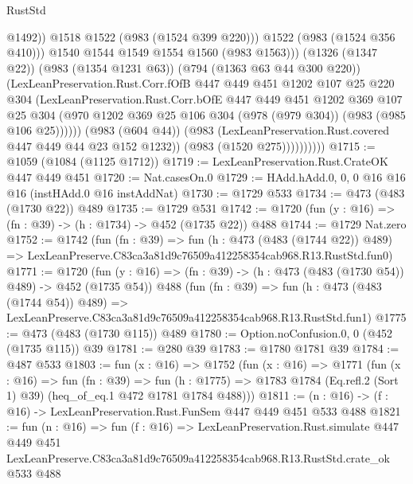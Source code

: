 \begin{lexlean}{RustStd}
\begin{coremodule}
                                  @1492))
                              @1518
                              @1522
                              (@983 (@1524 @399 @220)))
                            @1522
                            (@983 (@1524 @356 @410)))
                          @1540
                          @1544
                          @1549
                          @1554
                          @1560
                          (@983 @1563)))
                      (@1326 (@1347 @22))
                      (@983 (@1354 @1231 @63))
                      (@794 (@1363 @63 @44 @300 @220))
                      (LexLeanPreservation.Rust.Corr.fOfB
                        @447
                        @449
                        @451
                        @1202
                        @107
                        @25
                        @220
                        @304
                        (LexLeanPreservation.Rust.Corr.bOfE
                          @447
                          @449
                          @451
                          @1202
                          @369
                          @107
                          @25
                          @304
                          (@970
                            @1202
                            @369
                            @25
                            @106
                            @304
                            (@978 (@979 @304))
                            (@983 (@985 @106 @25))))))
                    (@983 (@604 @44))
                    (@983 (LexLeanPreservation.Rust.covered @447 @449 @44 @23 @152 @1232))
                    (@983 (@1520 @275))))))))))
@1715 := @1059 (@1084 (@1125 @1712))
@1719 := LexLeanPreservation.Rust.CrateOK @447 @449 @451
@1720 := Nat.casesOn.{0}
@1729 := HAdd.hAdd.{0, 0, 0} @16 @16 @16 (instHAdd.{0} @16 instAddNat)
@1730 := @1729 @533
@1734 := @473 (@483 (@1730 @22)) @489
@1735 := @1729 @531
@1742 := @1720 (fun (y : @16) => (fn : @39) -> (h : @1734) -> @452 (@1735 @22)) @488
@1744 := @1729 Nat.zero
@1752 := @1742
    (fun (fn : @39) =>
    fun (h : @473 (@483 (@1744 @22)) @489) =>
    LexLeanPreserve.C83ca3a81d9c76509a412258354cab968.R13.RustStd.fun0)
@1771 := @1720
    (fun (y : @16) => (fn : @39) -> (h : @473 (@483 (@1730 @54)) @489) -> @452 (@1735 @54))
    @488
    (fun (fn : @39) =>
    fun (h : @473 (@483 (@1744 @54)) @489) =>
    LexLeanPreserve.C83ca3a81d9c76509a412258354cab968.R13.RustStd.fun1)
@1775 := @473 (@483 (@1730 @115)) @489
@1780 := Option.noConfusion.{0, 0} (@452 (@1735 @115)) @39
@1781 := @280 @39
@1783 := @1780 @1781 @39
@1784 := @487 @533
@1803 := fun (x : @16) =>
  @1752
    (fun (x : @16) =>
    @1771
      (fun (x : @16) =>
      fun (fn : @39) =>
      fun (h : @1775) =>
      @1783 @1784 (Eq.refl.{2} (Sort 1) @39) (heq_of_eq.{1} @472 @1781 @1784 @488)))
@1811 := (n : @16) -> (f : @16) -> LexLeanPreservation.Rust.FunSem @447 @449 @451 @533 @488
@1821 := fun (n : @16) =>
  fun (f : @16) =>
  LexLeanPreservation.Rust.simulate
    @447
    @449
    @451
    LexLeanPreserve.C83ca3a81d9c76509a412258354cab968.R13.RustStd.crate_ok
    @533
    @488
\end{coremodule}
\end{lexlean}
